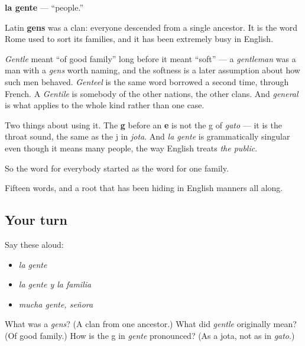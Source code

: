 \begin{cousinweb}
\textbf{la gente} --- \textquotedblleft{}people.\textquotedblright{}

Latin \textbf{gens} was a clan: everyone descended from a single ancestor. It is the word Rome used to sort its families, and it has been extremely busy in English.

\emph{Gentle} meant \textquotedblleft{}of good family\textquotedblright{} long before it meant \textquotedblleft{}soft\textquotedblright{} --- a \emph{gentleman} was a man with a \emph{gens} worth naming, and the softness is a later assumption about how such men behaved. \emph{Genteel} is the same word borrowed a second time, through French. A \emph{Gentile} is somebody of the other nations, the other clans. And \emph{general} is what applies to the whole kind rather than one case.

Two things about using it. The \textbf{g} before an \textbf{e} is not the g of \emph{gato} --- it is the throat sound, the same as the j in \emph{jota}. And \emph{la gente} is grammatically singular even though it means many people, the way English treats \emph{the public}.

So the word for everybody started as the word for one family.
\end{cousinweb}

\begin{grammarlens}[title={What you've built}]
Fifteen words, and a root that has been hiding in English manners all along.
\end{grammarlens}

\subsection*{Your turn}
Say these aloud:

\begin{itemize}
\raggedright
  \item \emph{la gente}
  \item \emph{la gente y la familia}
  \item \emph{mucha gente, señora}
\end{itemize}

\begin{tcolorbox}[breakable,colback=teal!4,colframe=teal!35!black,title={Before you move on}]
What was a \emph{gens}? (A clan from one ancestor.) What did \emph{gentle} originally mean? (Of good family.) How is the g in \emph{gente} pronounced? (As a jota, not as in \emph{gato}.)
\end{tcolorbox}
